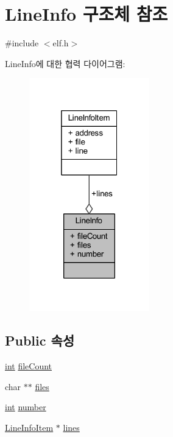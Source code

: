 \hypertarget{struct_line_info}{}\section{Line\+Info 구조체 참조}
\label{struct_line_info}


{\ttfamily \#include $<$elf.\+h$>$}



Line\+Info에 대한 협력 다이어그램\+:\nopagebreak
\begin{figure}[H]
\begin{center}
\leavevmode
\includegraphics[width=148pt]{struct_line_info__coll__graph}
\end{center}
\end{figure}
\subsection*{Public 속성}
\begin{DoxyCompactItemize}
\item 
\mbox{\hyperlink{_util_8cpp_a0ef32aa8672df19503a49fab2d0c8071}{int}} \mbox{\hyperlink{struct_line_info_a360dc53764f78411604eb10087a4218c}{file\+Count}}
\item 
char $\ast$$\ast$ \mbox{\hyperlink{struct_line_info_ac6a6675bb12eb9ae43556403a8f98f21}{files}}
\item 
\mbox{\hyperlink{_util_8cpp_a0ef32aa8672df19503a49fab2d0c8071}{int}} \mbox{\hyperlink{struct_line_info_a5f3cdc8f3a9dceeb63412d3c1e468069}{number}}
\item 
\mbox{\hyperlink{struct_line_info_item}{Line\+Info\+Item}} $\ast$ \mbox{\hyperlink{struct_line_info_a774f0940e01fa7dd5a07dfa19acc81c6}{lines}}
\end{DoxyCompactItemize}


